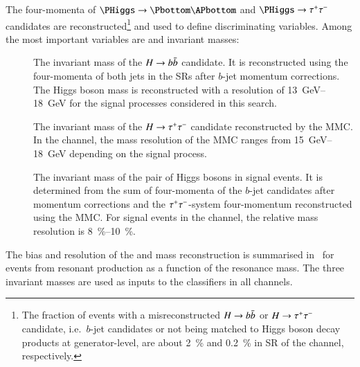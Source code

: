 The four-momenta of $\PHiggs \ra \Pbottom\APbottom$ and $\PHiggs \ra \tautau$
candidates are reconstructed\footnote{The fraction of events with a
  misreconstructed $H \to b\bar{b}$ or $H \to \tau^{+} \tau^{-}$ candidate, i.e.\ $b$-jet
  candidates or \tauhadvis not being matched to Higgs boson decay products at
  generator-level, are about \SI{2}{\percent} and \SI{0.2}{\percent} in SR of
  the \hadhad channel, respectively.}  and used to define discriminating
variables. Among the most important variables are \PHiggs and \HH invariant
masses:
\begin{description}

\item[\mBB] The invariant mass of the $H \to b\bar{b}$ candidate. It is
  reconstructed using the four-momenta of both \btagged jets in the SRs after
  $b$-jet momentum corrections. The Higgs boson mass is reconstructed with a
  resolution of \SIrange{13}{18}{\GeV} for the signal processes considered in
  this search.

\item[\mMMC] The invariant mass of the $H \to \tau^{+} \tau^{-}$ candidate reconstructed
  by the MMC. In the \hadhad channel, the mass resolution of the MMC ranges from
  \SIrange{15}{18}{\GeV} depending on the signal process.

\item[\mHH] The invariant mass of the pair of Higgs bosons in signal events. It
  is determined from the sum of four-momenta of the $b$-jet candidates after
  momentum corrections and the $\tau^{+} \tau^{-}$-system four-momentum reconstructed
  using the MMC. For signal events in the \hadhad channel, the relative mass
  resolution is \SIrange{8}{10}{\percent}.

\end{description}
The bias and resolution of the \PHiggs and \HH mass reconstruction is summarised
in~ for events from resonant \HH production as a
function of the resonance mass. The three invariant masses are used as inputs to
the classifiers in all channels.


